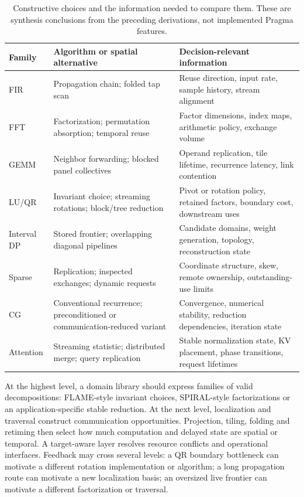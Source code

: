 \documentclass[final,3p,times,authoryear]{elsarticle}
\begin{document}
\begin{table}[ht]
\caption{Constructive choices and the information needed to compare them. These are synthesis conclusions from the preceding derivations, not implemented Pragma features.}
\label{tab:constructive-comparison}
\small
\begin{tabularx}{\linewidth}{@{}>{\raggedright\arraybackslash}p{1.55cm}XX@{}}
\toprule
Family & Algorithm or spatial alternative & Decision-relevant information \\
\midrule
FIR & Propagation chain; folded tap scan & Reuse direction, input rate, sample history, stream alignment \\
FFT & Factorization; permutation absorption; temporal reuse & Factor dimensions, index maps, arithmetic policy, exchange volume \\
GEMM & Neighbor forwarding; blocked panel collectives & Operand replication, tile lifetime, recurrence latency, link contention \\
LU/QR & Invariant choice; streaming rotations; block/tree reduction & Pivot or rotation policy, retained factors, boundary cost, downstream uses \\
Interval DP & Stored frontier; overlapping diagonal pipelines & Candidate domains, weight generation, topology, reconstruction state \\
Sparse & Replication; inspected exchanges; dynamic requests & Coordinate structure, skew, remote ownership, outstanding-use limits \\
CG & Conventional recurrence; preconditioned or communication-reduced variant & Convergence, numerical stability, reduction dependencies, iteration state \\
Attention & Streaming statistic; distributed merge; query replication & Stable normalization state, KV placement, phase transitions, request lifetimes \\
\bottomrule
\end{tabularx}
\end{table}

At the highest level, a domain library should express families of valid decompositions: FLAME-style invariant choices, SPIRAL-style factorizations or an application-specific stable reduction. At the next level, localization and traversal construct communication opportunities. Projection, tiling, folding and retiming then select how much computation and delayed state are spatial or temporal. A target-aware layer resolves resource conflicts and operational interfaces. Feedback may cross several levels: a QR boundary bottleneck can motivate a different rotation implementation or algorithm; a long propagation route can motivate a new localization basis; an oversized live frontier can motivate a different factorization or traversal.
\end{document}
